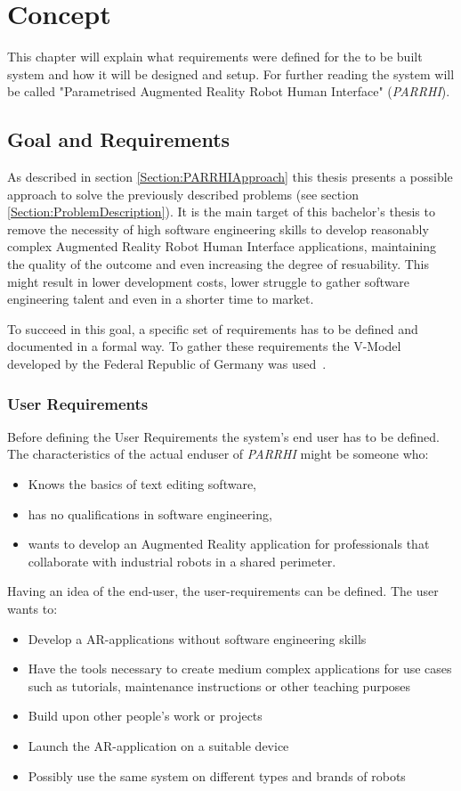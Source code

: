 \chapter{Concept}\label{Chap:Concept}

This chapter will explain what requirements were defined for the to be built system and how it will be designed and setup. For further reading the system will be called "Parametrised Augmented Reality Robot Human Interface" (\textit{PARRHI}).

\section{Goal and Requirements}
As described in section \ref{Section:PARRHIApproach} this thesis presents a possible approach to solve the previously described problems (see section \ref{Section:ProblemDescription}). It is the main target of this bachelor's thesis to remove the necessity of high software engineering skills to develop reasonably complex Augmented Reality Robot Human Interface applications, maintaining the quality of the outcome and even increasing the degree of resuability. This might result in lower development costs, lower struggle to gather software engineering talent and even in a shorter time to market.

To succeed in this goal, a specific set of requirements has to be defined and documented in a formal way. To gather these requirements the V-Model developed by the Federal Republic of Germany was used~\cite{vmodell}.

\subsection{User Requirements}
Before defining the User Requirements the system's end user has to be defined. The characteristics of the actual enduser of \textit{PARRHI} might be someone who:
\begin{itemize}
	\setlength\itemsep{-1em}
	\item Knows the basics of text editing software,
	\item has no qualifications in software engineering,
	\item wants to develop an Augmented Reality application for professionals that collaborate with industrial robots in a shared perimeter.
\end{itemize}

Having an idea of the end-user, the user-requirements can be defined. The user wants to:
\begin{itemize}
	\setlength\itemsep{-1em}
	\item Develop a AR-applications without software engineering skills
	\item Have the tools necessary to create medium complex applications for use cases such as tutorials, maintenance instructions or other teaching purposes
	\item Build upon other people's work or projects
	\item Launch the AR-application on a suitable device
	\item Possibly use the same system on different types and brands of robots
\end{itemize}

